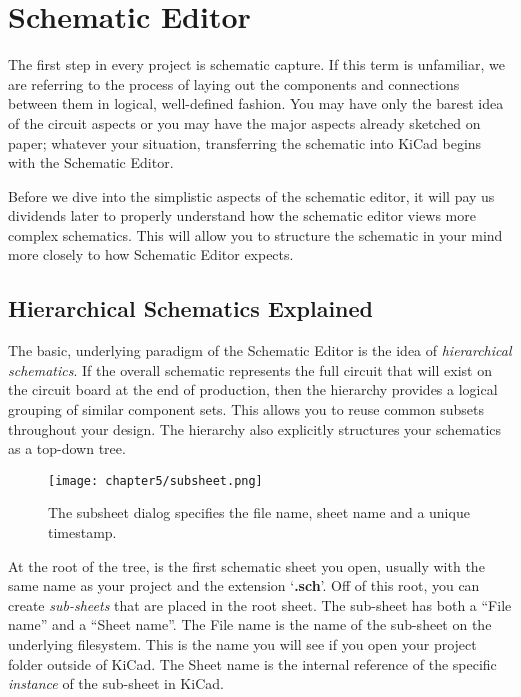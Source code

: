 
\chapter{Schematic Editor}

The first step in every project is schematic capture.
If this term is unfamiliar, we are referring to the process of laying out the components and connections between them in logical, well-defined fashion.
You may have only the barest idea of the circuit aspects or you may have the major aspects already sketched on paper;
whatever your situation, transferring the schematic into KiCad begins with the Schematic Editor.

Before we dive into the simplistic aspects of the schematic editor, it will pay us dividends later to properly understand how the schematic editor views more complex schematics.
This will allow you to structure the schematic in your mind more closely to how Schematic Editor expects.

\section{Hierarchical Schematics Explained}

The basic, underlying paradigm of the Schematic Editor is the idea of \textit{hierarchical schematics}.
If the overall schematic represents the full circuit that will exist on the circuit board at the end of production, then the hierarchy provides a logical grouping of similar component sets.
This allows you to reuse common subsets throughout your design.
The hierarchy also explicitly structures your schematics as a top-down tree.
\begin{figure}
	\texttt{[image: chapter5/subsheet.png]}
	\caption[Sub-Sheets]{The subsheet dialog specifies the file name, sheet name and a unique timestamp.}
\end{figure}

At the root of the tree, is the first schematic sheet you open, usually with the same name as your project and the extension `\textbf{.sch}'.
Off of this root, you can create \textit{sub-sheets} that are placed in the root sheet.
The sub-sheet has both a ``File name'' and a ``Sheet name''.
The File name is the name of the sub-sheet on the underlying filesystem.
This is the name you will see if you open your project folder outside of KiCad.
The Sheet name is the internal reference of the specific \textit{instance} of the sub-sheet in KiCad.

